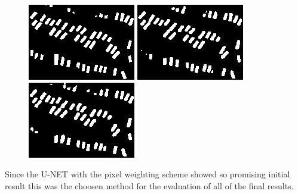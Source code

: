 \documentclass[a4paper,11pt]{article}
\begin{document}
\begin{figure}[H]
  \includegraphics[width=\linewidth]{class_vs_w/label_2}
\endminipage\hfill
{}
  \includegraphics[width=\linewidth]{class_vs_w/un_weight_2}
\endminipage\hfill
{}%
  \includegraphics[width=\linewidth]{class_vs_w/weight_2}
\endminipage
\caption{}
\end{figure}
Since the U-NET with the pixel weighting scheme showed so promising initial result this was the choosen method for the evaluation of all of the final results.
\end{document}
